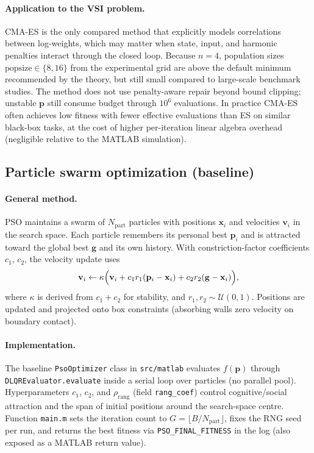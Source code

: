 \documentclass[pdflatex,sn-mathphys-num]{sn-jnl}
\begin{document}
\paragraph{Application to the VSI problem.}
CMA-ES is the only compared method that explicitly models correlations between log-weights, which may matter when state, input, and harmonic penalties interact through the closed loop.
Because $n=4$, population sizes $\mathrm{popsize}\in\{8,16\}$ from the experimental grid are above the default minimum recommended by the theory, but still small compared to large-scale benchmark studies.
The method does not use penalty-aware repair beyond bound clipping; unstable $\mathbf{p}$ still consume budget through $10^6$ evaluations.
In practice CMA-ES often achieves low fitness with fewer effective evaluations than ES on similar black-box tasks, at the cost of higher per-iteration linear algebra overhead (negligible relative to the MATLAB simulation).

\subsection{Particle swarm optimization (baseline)}\label{subsec:pso}

\paragraph{General method.}
PSO maintains a swarm of $N_{\mathrm{part}}$ particles with positions $\mathbf{x}_i$ and velocities $\mathbf{v}_i$ in the search space.
Each particle remembers its personal best $\mathbf{p}_i$ and is attracted toward the global best $\mathbf{g}$ and its own history.
With constriction-factor coefficients $c_1$, $c_2$, the velocity update uses
\begin{equation}
  \mathbf{v}_i \leftarrow \kappa\Bigl(\mathbf{v}_i + c_1 r_1 (\mathbf{p}_i-\mathbf{x}_i) + c_2 r_2(\mathbf{g}-\mathbf{x}_i)\Bigr),
  \label{eq:pso-velocity}
\end{equation}
where $\kappa$ is derived from $c_1+c_2$ for stability, and $r_1,r_2\sim\mathcal{U}(0,1)$.
Positions are updated and projected onto box constraints (absorbing walls zero velocity on boundary contact).

\paragraph{Implementation.}
The baseline \texttt{PsoOptimizer} class in \texttt{src/matlab} evaluates $f(\mathbf{p})$ through \texttt{DLQREvaluator.evaluate} inside a serial loop over particles (no parallel pool).
Hyperparameters $c_1$, $c_2$, and $\rho_{\mathrm{rang}}$ (field \texttt{rang\_coef}) control cognitive/social attraction and the span of initial positions around the search-space centre.
Function \texttt{main.m} sets the iteration count to $G=\lfloor B/N_{\mathrm{part}}\rfloor$, fixes the RNG seed per run, and returns the best fitness via \texttt{PSO\_FINAL\_FITNESS} in the log (also exposed as a MATLAB return value).
\end{document}
